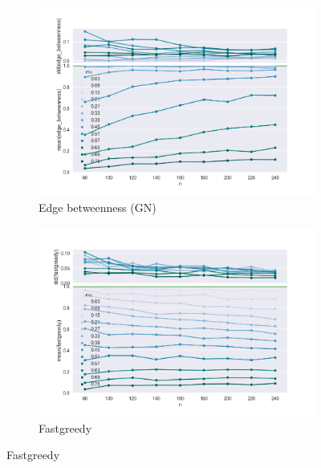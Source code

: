 \begin{figure}
	\centering
    \begin{subfigure}[b]{0.32\textwidth}
        \includegraphics[width=\textwidth]{fig/ami_vs_n_edge_betweenness}
        \caption{Edge betweenness (GN)}
        \label{fig:gull}
    \end{subfigure}
    \qquad
    \begin{subfigure}[b]{0.32\textwidth}
        \includegraphics[width=\textwidth]{fig/ami_vs_n_fastgreedy}
        \caption{Fastgreedy}
        \label{fig:tiger}
    \end{subfigure}
    

\end{figure}
